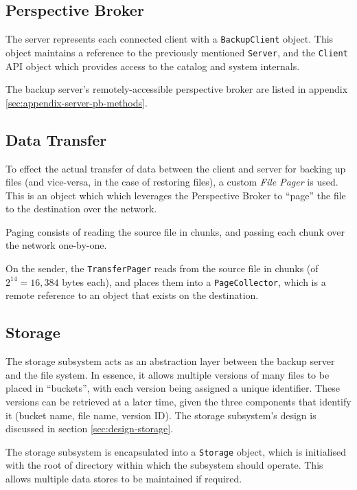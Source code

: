\subsection{Perspective Broker}
\label{sec:implementation-server-pb}

The server represents each connected client with a \verb!BackupClient! object.
This object maintains a reference to the previously mentioned \verb!Server!,
and the \verb!Client! API object which provides access to the catalog and
system internals.

The backup server's remotely-accessible perspective broker are listed in
appendix \ref{sec:appendix-server-pb-methods}.

\subsection{Data Transfer}
\label{sec:implementation-server-transfer}

To effect the actual transfer of data between the client and server for backing
up files (and vice-versa, in the case of restoring files), a custom \emph{File
Pager} is used. This is an object which which leverages the Perspective Broker
to ``page'' the file to the destination over the network.

Paging consists of reading the source file in chunks, and passing each chunk
over the network one-by-one.

On the sender, the \verb!TransferPager! reads from the source file in chunks
(of $2^{14} = 16,384$ bytes each), and places them into a \verb!PageCollector!,
which is a remote reference to an object that exists on the destination.

\subsection{Storage}
\label{sec:implementation-server-storage}

The storage subsystem acts as an abstraction layer between the backup server
and the file system. In essence, it allows multiple versions of many files to
be placed in ``buckets'', with each version being assigned a unique identifier.
These versions can be retrieved at a later time, given the three components
that identify it (bucket name, file name, version ID). The storage subsystem's
design is discussed in section \ref{sec:design-storage}.

The storage subsystem is encapsulated into a \verb!Storage! object, which is
initialised with the root of directory within which the subsystem should
operate. This allows multiple data stores to be maintained if required.

